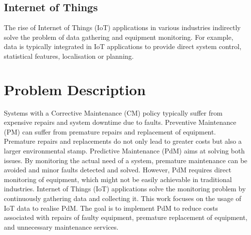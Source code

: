 \subsection{Internet of Things}
The rise of Internet of Things (IoT) applications in various industries indirectly solve the problem of data gathering and equipment monitoring.
For example, data is typically integrated in IoT applications to provide direct system control, statistical features, localisation or planning.  

\section{Problem Description}
\label{sec:problem-description}

Systems with a Corrective Maintenance (CM) policy typically suffer from expensive repairs and system downtime due to faults.
Preventive Maintenance (PM) can suffer from premature repairs and replacement of equipment.
Premature repairs and replacements do not only lead to greater costs but also a larger environmental stamp. 
Predictive Maintenance (PdM) aims at solving both issues.
By monitoring the actual need of a system, premature maintenance can be avoided and minor faults detected and solved.
However, PdM requires direct monitoring of equipment, which might not be easily achievable in traditional industries.
Internet of Things (IoT) applications solve the monitoring problem by continuously gathering data and collecting it.
This work focuses on the usage of IoT data to realise PdM.
The goal is to implement PdM to reduce costs associated with repairs of faulty equipment, premature replacement of equipment, and unnecessary maintenance services.


